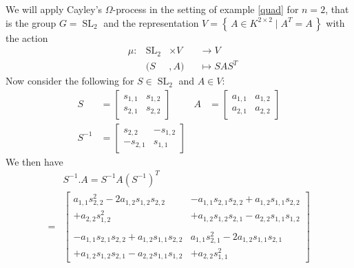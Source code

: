 \begin{example}\label{theex}
We will apply Cayley's $\Omega$-process in the setting of example \ref{quad} for $n=2$, that is the group $G = \operatorname{SL}_2$ and the representation $ V = \left\{ \, A \in K^{2 \times 2} \mid A^T = A \, \right\} $ with the action
  \begin{equation}
    \begin{aligned}
      &\mu \colon & \operatorname{SL}_2 &\times  V&&  \longrightarrow  V \\
      && (  S  &,   A  )  &&\longmapsto  SAS^T
    \end{aligned}
  \end{equation}
  Now consider the following for $S \in \operatorname{SL}_2$ and $A \in V$:
  \begin{equation}
    \begin{aligned}
      S &=
      \begin{bmatrix}
        s_{1,1} & s_{1,2} \\
        s_{2,1} & s_{2,2}
      \end{bmatrix}
      & A &=
      \begin{bmatrix}
        a_{1,1} & a_{1,2} \\
        a_{2,1} & a_{2,2}
      \end{bmatrix}
      \\
      S^{-1} &=
      \begin{bmatrix}
        s_{2,2} & -s_{1,2} \\
        -s_{2,1} & s_{1,1}
      \end{bmatrix}
    \end{aligned}
  \end{equation}
  We then have
  \begin{equation}
    \begin{aligned}
      &S^{-1}.A = S^{-1}A\left(S^{-1}\right)^T  \\ =&
      \begin{bmatrix}
        a_{1,1}s_{2,2}^2 - 2a_{1,2}s_{1,2}s_{2,2} & -a_{1,1}s_{2,1}s_{2,2} + a_{1,2}s_{1,1}s_{2,2}\\
        + a_{2,2}s_{1,2}^2 &  + a_{1,2}s_{1,2}s_{2,1} - a_{2,2}s_{1,1}s_{1,2} \\
        &\\
        - a_{1,1}s_{2,1}s_{2,2} + a_{1,2}s_{1,1}s_{2,2} & a_{1,1}s_{2,1}^2 - 2a_{1,2}s_{1,1}s_{2,1}\\
        + a_{1,2}s_{1,2}s_{2,1} - a_{2,2}s_{1,1}s_{1,2} & + a_{2,2}s_{1,1}^2
      \end{bmatrix}

\end{aligned}
\end{equation}
\end{example}
